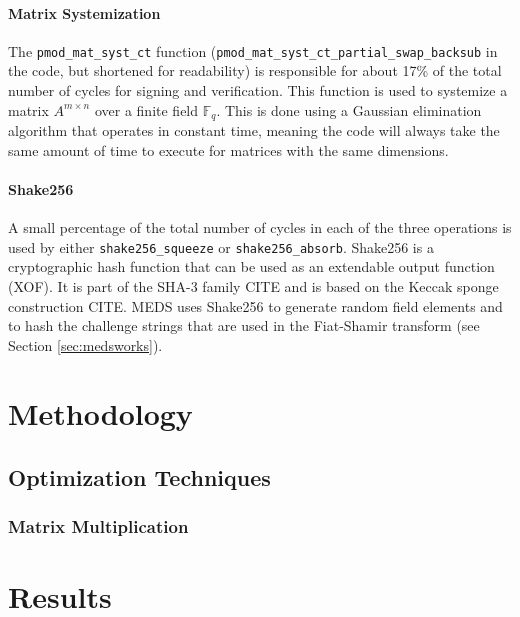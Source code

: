 \documentclass[11pt,a4paper]{report}
\begin{document}
\subsubsection{Matrix Systemization}
The \texttt{pmod\_mat\_syst\_ct} function (\texttt{pmod\_mat\_syst\_ct\_partial\_swap\_backsub} in the code, but shortened for readability) is responsible for about 17\% of the total number of cycles for signing and verification. This function is used to systemize a matrix $A^{m \times n}$ over a finite field $\mathbb{F}_q$. This is done using a Gaussian elimination algorithm that operates in constant time, meaning the code will always take the same amount of time to execute for matrices with the same dimensions.


\subsubsection{Shake256}
A small percentage of the total number of cycles in each of the three operations is used by either \texttt{shake256\_squeeze} or \texttt{shake256\_absorb}. Shake256 is a cryptographic hash function that can be used as an extendable output function (XOF). It is part of the SHA-3 family CITE and is based on the Keccak sponge construction CITE. MEDS uses Shake256 to generate random field elements and to hash the challenge strings that are used in the Fiat-Shamir transform (see Section \ref{sec:medsworks}).

\chapter{Methodology}
\label{ch:methodology}

\section{Optimization Techniques}

\subsection{Matrix Multiplication}

\chapter{Results}
\label{ch:results}
\end{document}
